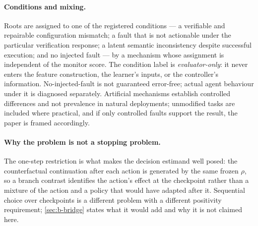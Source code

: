 \paragraph{Conditions and mixing.}
Roots are assigned to one of the registered conditions --- a verifiable and
repairable configuration mismatch; a fault that is not actionable under the
particular verification response; a latent semantic inconsistency despite
successful execution; and no injected fault --- by a mechanism whose assignment
is independent of the monitor score.  The condition label is
\emph{evaluator-only}: it never enters the feature construction, the learner's
inputs, or the controller's information.  No-injected-fault is not guaranteed
error-free; actual agent behaviour under it is diagnosed separately.  Artificial
mechanisms establish controlled differences and not prevalence in natural
deployments; unmodified tasks are included where practical, and if only
controlled faults support the result, the paper is framed accordingly.

\paragraph{Why the problem is not a stopping problem.}
The one-step restriction is what makes the decision estimand well posed: the
counterfactual continuation after each action is generated by the same frozen
$\rho$, so a branch contrast identifies the action's effect at the checkpoint
rather than a mixture of the action and a policy that would have adapted after
it.  Sequential choice over checkpoints is a different problem with a different
positivity requirement; \cref{sec:b-bridge} states what it would add and why it
is not claimed here.
